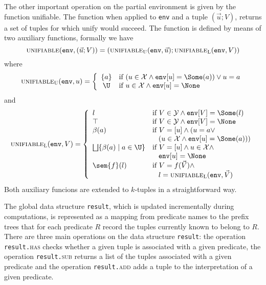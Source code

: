The other important operation on the partial environment is given by
the function {\sc unifiable}. The function when applied to {\tt env}
and a tuple $(\vec{u};V)$, returns a set of tuples for which {\sc
  unify} would succeed. The function is defined by means of two
auxiliary functions, formally we have
$$
\textsc{unifiable}(\texttt{env},(\vec{u};V)) =
(\textsc{unifiable}_\textsc{U}(\texttt{env},\vec{u});
\textsc{unifiable}_\textsc{L}(\texttt{env},V))
$$
where
$$
\textsc{unifiable}_\textsc{U}(\texttt{env},u) =
\left\{
\begin{array}{cl}
\{ a \} & \hbox{if } (u\in\mathcal{X}\wedge{\tt env}[u]=\Some(a))\vee
u=a\\

\U & \hbox{if } u\in\mathcal{X}\wedge{\tt env}[u]=\None\\
\end{array}
\right.
$$
and
$$
\begin{array}{ll}
\textsc{unifiable}_\textsc{L}(\texttt{env},V) =
\left\{
\begin{array}{ll}

l & \hbox{if } V\in\mathcal{Y}\wedge{\tt env}[V]=\Some(l)\\

\top & \hbox{if } V\in\mathcal{Y}\wedge{\tt env}[V]=\None\\

\beta(a) & \hbox{if } V=[u] \wedge (u=a \vee \\
& \hspace{3mm} (u\in\mathcal{X}\wedge{\tt env}[u]=\Some(a)))\\

\bigsqcup \{ \beta(a) \mid a \in \U \} & \hbox{if } V=[u] \wedge
u\in\mathcal{X}\wedge\\
& \hspace{3mm} {\tt env}[u]=\None\\

\sem{f}(l) & \hbox{if }
V=f(\vec{V}) \wedge \\
& \hspace{3mm} l = \textsc{unifiable}_\textsc{L}(\texttt{env},\vec{V}) \\

\end{array}
\right.
\end{array}
$$
Both auxiliary funcions are extended to $k$-tuples in a
straightforward way.

The global data structure \texttt{result}, which is updated
incrementally during computations, is represented as a mapping from
predicate names to the prefix trees that for each predicate $R$ record
the tuples currently known to belong to $R$. There are three main
operations on the data structure \texttt{result}: the operation
\texttt{result.}\textsc{has} checks whether a given tuple is
associated with a given predicate, the operation
\texttt{result.}\textsc{sub} returns a list of the tuples associated
with a given predicate and the operation \texttt{result.}\textsc{add}
adds a tuple to the interpretation of a given predicate.

